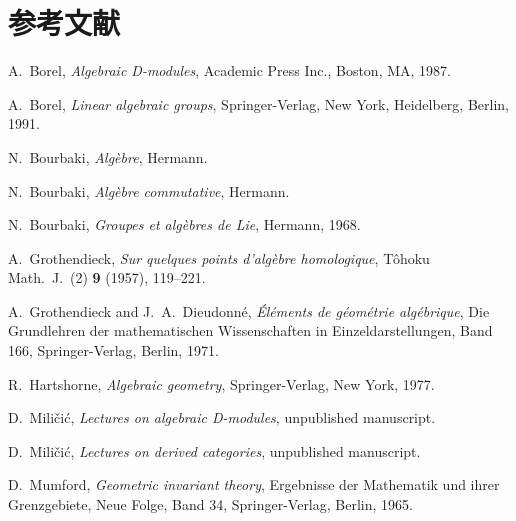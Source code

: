 \chapter*{参考文献}
\begin{enumerate}[label={[\arabic*]}, leftmargin=2.2em, itemsep=0.2em]
  \item A.~Borel, \emph{Algebraic D-modules}, Academic Press Inc., Boston, MA, 1987.
  \item A.~Borel, \emph{Linear algebraic groups}, Springer-Verlag, New York, Heidelberg, Berlin, 1991.
  \item N.~Bourbaki, \emph{Algèbre}, Hermann.
  \item N.~Bourbaki, \emph{Algèbre commutative}, Hermann.
  \item N.~Bourbaki, \emph{Groupes et algèbres de Lie}, Hermann, 1968.
  \item A.~Grothendieck, \emph{Sur quelques points d'algèbre homologique}, Tôhoku Math.\ J.\ (2) \textbf{9} (1957), 119--221.
  \item A.~Grothendieck and J.~A.~Dieudonné, \emph{Éléments de géométrie algébrique}, Die Grundlehren der mathematischen Wissenschaften in Einzeldarstellungen, Band 166, Springer-Verlag, Berlin, 1971.
  \item R.~Hartshorne, \emph{Algebraic geometry}, Springer-Verlag, New York, 1977.
  \item D.~Miličić, \emph{Lectures on algebraic D-modules}, unpublished manuscript.
  \item D.~Miličić, \emph{Lectures on derived categories}, unpublished manuscript.
  \item D.~Mumford, \emph{Geometric invariant theory}, Ergebnisse der Mathematik und ihrer Grenzgebiete, Neue Folge, Band 34, Springer-Verlag, Berlin, 1965.
\end{enumerate}
